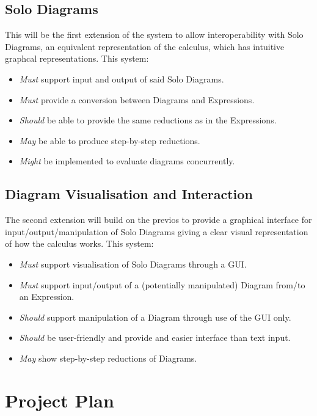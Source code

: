 \documentclass{article}
\begin{document}
\subsection{Solo Diagrams}
This will be the first extension of the system to allow interoperability with Solo Diagrams, an equivalent representation of the calculus, which has intuitive graphcal representations.
This system:
\begin{itemize}
	\item \textit{Must} support input and output of said Solo Diagrams.
	\item \textit{Must} provide a conversion between Diagrams and Expressions.
	\item \textit{Should} be able to provide the same reductions as in the Expressions.
	\item \textit{May} be able to produce step-by-step reductions.
	\item \textit{Might} be implemented to evaluate diagrams concurrently.
\end{itemize}

\subsection{Diagram Visualisation and Interaction}
The second extension will build on the previos to provide a graphical interface for input/output/manipulation of Solo Diagrams giving a clear visual representation of how the calculus works.
This system:
\begin{itemize}
	\item \textit{Must} support visualisation of Solo Diagrams through a GUI\@.
	\item \textit{Must} support input/output of a (potentially manipulated) Diagram from/to an Expression.
	\item \textit{Should} support manipulation of a Diagram through use of the GUI only.
	\item \textit{Should} be user-friendly and provide and easier interface than text input.
	\item \textit{May} show step-by-step reductions of Diagrams.
\end{itemize}


\section{Project Plan}
\end{document}
